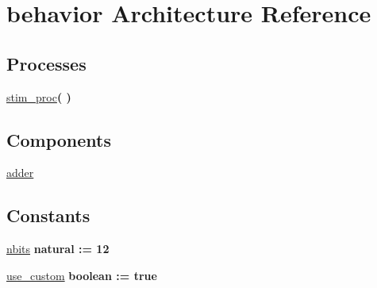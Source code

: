 \hypertarget{classtb__adder_1_1behavior}{}\section{behavior Architecture Reference}
\label{classtb__adder_1_1behavior}
\subsection*{Processes}
 \begin{DoxyCompactItemize}
\item 
\hyperlink{classtb__adder_1_1behavior_ad2efa6785cff833c341e27596b21aeb5}{stim\+\_\+proc}{\bfseries  (  )}
\end{DoxyCompactItemize}
\subsection*{Components}
 \begin{DoxyCompactItemize}
\item 
\hyperlink{classtb__adder_1_1behavior_a9d7a8a381439c61aea549e7a47ec7a6f}{adder}  {\bfseries }  
\end{DoxyCompactItemize}
\subsection*{Constants}
 \begin{DoxyCompactItemize}
\item 
\hyperlink{classtb__adder_1_1behavior_aff8823a253db156c5a7a40d1b813343f}{nbits} {\bfseries \textcolor{vhdlchar}{natural}\textcolor{vhdlchar}{ }\textcolor{vhdlchar}{ }\textcolor{vhdlchar}{\+:}\textcolor{vhdlchar}{=}\textcolor{vhdlchar}{ }\textcolor{vhdlchar}{ } \textcolor{vhdldigit}{12} \textcolor{vhdlchar}{ }} 
\item 
\hyperlink{classtb__adder_1_1behavior_ae53b6cfbb1b5d32c932c417636d6ac3c}{use\+\_\+custom} {\bfseries \textcolor{vhdlchar}{boolean}\textcolor{vhdlchar}{ }\textcolor{vhdlchar}{ }\textcolor{vhdlchar}{\+:}\textcolor{vhdlchar}{=}\textcolor{vhdlchar}{ }\textcolor{vhdlchar}{ }\textcolor{vhdlchar}{ }\textcolor{vhdlchar}{ }\textcolor{vhdlchar}{true}\textcolor{vhdlchar}{ }} 
\end{DoxyCompactItemize}
